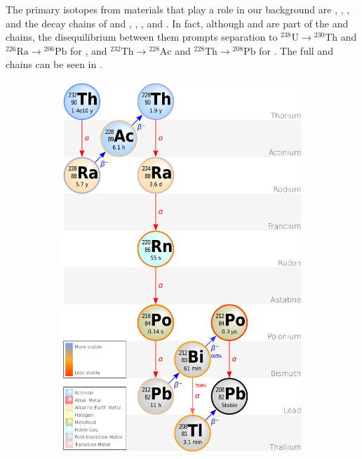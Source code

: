 The primary isotopes from materials that play a role in our background are , , , and the decay chains
of and , , , and .  In fact, although  and  are part of the
 and  chains, the disequilibrium between them prompts separation to
$\mathrm{^{238}U} \rightarrow \mathrm{^{230}Th}$ and $\mathrm{^{226}Ra} \rightarrow \mathrm{^{206}Pb}$ for , and
$\mathrm{^{232}Th} \rightarrow \mathrm{^{228}Ac}$ and $\mathrm{^{228}Th} \rightarrow \mathrm{^{208}Pb}$ for .  The full
 and  chains can be seen in .

\begin{figure}
    \centering
    \begin{subfigure}[t]{0.5\textwidth}
        \centering
        \includegraphics[width=\textwidth]{Decay_Chain_of_Thorium-232}

\end{subfigure}
\end{figure}
